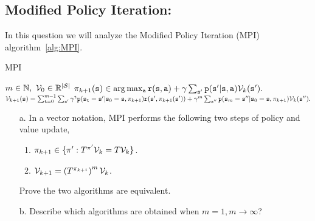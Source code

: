 \subsection{Modified Policy Iteration:}
In this question we will analyze the Modified Policy Iteration (MPI) algorithm~\ref{alg:MPI}. 
\begin{center}
\begin{minipage}{1.1\textwidth}
\begin{algorithm}[H]
	\caption{MPI}
	\label{alg:MPI}
	\begin{algorithmic}
		 $m \in \mathbb{N},~\mathcal{V}_0 \in \mathbb{R}^{|\mathcal{S}|}$
			\FOR{ $\state\in \States$}
				\STATE $\pi_{k+1}({\tt s})\in \arg\max_{{\tt a}} {\tt r}({\tt s},{\tt a}) + \gamma \sum_{{\tt s}'}{\tt p}({\tt s}' | {\tt s},{\tt a})\mathcal{V}_k({\tt s}').$
			\ENDFOR
			\FOR{$\state\in \States$}
				\STATE $\mathcal{V}_{k+1}({\tt s})= \sum_{{\tt t}=0}^{m-1}\sum_{{\tt s}'} \gamma^{\tt t} {\tt p}({\tt s}_{\tt t}={\tt s}' | {\tt s}_0={\tt s},\pi_{k+1}) {\tt r}({\tt s}',\pi_{k+1}({\tt s}')) +\gamma^m \sum_{{\tt s}''}{\tt p}({\tt s}_m={\tt s}'' | {\tt s}_0={\tt s}, \pi_{k+1})\mathcal{V}_{k}({\tt s}'').$
			\ENDFOR
		\ENDWHILE
	\end{algorithmic}
\end{algorithm}
\end{minipage}
\end{center}

\begin{itemize}
\item [a.] In a vector notation, MPI performs the following two steps of policy and value update,
\begin{enumerate}
\item $\pi_{k+1} \in \{\pi': T^{\pi'}\mathcal{V}_k=T \mathcal{V}_k \}$.
\item $\mathcal{V}_{k+1} =\left(T^{\pi_{k+1}}\right)^m \mathcal{V}_{k}$.
\end{enumerate}
Prove the two algorithms are equivalent.
\item [b.] Describe which algorithms are obtained when $m=1,m\to\infty$? 
\end{itemize}

